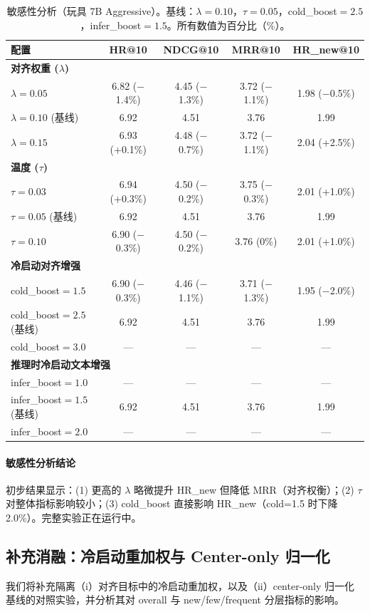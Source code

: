 \documentclass[sigconf,natbib=true]{acmart}
\begin{document}
\begin{table}[t]
\caption{敏感性分析（玩具 7B Aggressive）。基线：$\lambda{=}0.10$，$\tau{=}0.05$，cold\_boost${=}2.5$，infer\_boost${=}1.5$。所有数值为百分比（\%）。}
\label{tab:sensitivity}
\centering
\small
\begin{tabular}{lcccc}
\toprule
\textbf{配置} & HR@10 & NDCG@10 & MRR@10 & HR\_new@10 \\
\midrule
\multicolumn{5}{l}{\textbf{对齐权重 ($\lambda$)}} \\
$\lambda{=}0.05$ & 6.82 ($-$1.4\%) & 4.45 ($-$1.3\%) & 3.72 ($-$1.1\%) & 1.98 ($-$0.5\%) \\
$\lambda{=}0.10$ (基线) & 6.92 & 4.51 & 3.76 & 1.99 \\
$\lambda{=}0.15$ & 6.93 (+0.1\%) & 4.48 ($-$0.7\%) & 3.72 ($-$1.1\%) & 2.04 (+2.5\%) \\
\midrule
\multicolumn{5}{l}{\textbf{温度 ($\tau$)}} \\
$\tau{=}0.03$ & 6.94 (+0.3\%) & 4.50 ($-$0.2\%) & 3.75 ($-$0.3\%) & 2.01 (+1.0\%) \\
$\tau{=}0.05$ (基线) & 6.92 & 4.51 & 3.76 & 1.99 \\
$\tau{=}0.10$ & 6.90 ($-$0.3\%) & 4.50 ($-$0.2\%) & 3.76 (0\%) & 2.01 (+1.0\%) \\
\midrule
\multicolumn{5}{l}{\textbf{冷启动对齐增强}} \\
cold\_boost${=}1.5$ & 6.90 ($-$0.3\%) & 4.46 ($-$1.1\%) & 3.71 ($-$1.3\%) & 1.95 ($-$2.0\%) \\
cold\_boost${=}2.5$ (基线) & 6.92 & 4.51 & 3.76 & 1.99 \\
cold\_boost${=}3.0$ & --- & --- & --- & --- \\
\midrule
\multicolumn{5}{l}{\textbf{推理时冷启动文本增强}} \\
infer\_boost${=}1.0$ & --- & --- & --- & --- \\
infer\_boost${=}1.5$ (基线) & 6.92 & 4.51 & 3.76 & 1.99 \\
infer\_boost${=}2.0$ & --- & --- & --- & --- \\
\bottomrule
\end{tabular}
\end{table}

\paragraph{敏感性分析结论}
初步结果显示：(1) 更高的 $\lambda$ 略微提升 HR\_new 但降低 MRR（对齐权衡）；(2) $\tau$ 对整体指标影响较小；(3) cold\_boost 直接影响 HR\_new（cold=1.5 时下降 2.0\%）。完整实验正在运行中。

\subsection{补充消融：冷启动重加权与 Center-only 归一化}
\label{app:additional}
我们将补充隔离（i）对齐目标中的冷启动重加权，以及（ii）center-only 归一化基线的对照实验，并分析其对 overall 与 new/few/frequent 分层指标的影响。

\balance  %


\end{document}
